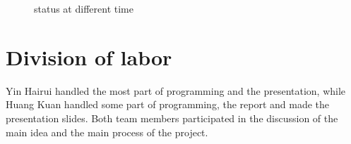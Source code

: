 \documentclass[acmtog]{acmart}
\begin{document}
\begin{figure}[h]
	\centering
	\caption{status at different time}
\end{figure}


\section{Division of labor}
Yin Hairui handled the most part of programming and the presentation, while Huang Kuan handled some part of programming, the report and made the presentation slides. Both team members participated in the discussion of the main idea and the main process of the project.
\end{document}
